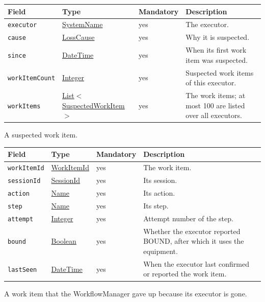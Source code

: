 \documentclass[a4paper]{arrowhead}
\newcommand{\mref}[1]{{\textcolor{ArrowheadPurple}{\hyperref[sec:model:#1]{#1}}}}
\newcommand{\pref}[1]{{\textcolor{ArrowheadGrey}{\hyperref[sec:model:primitives:#1]{#1}}}}
\begin{document}
{\small
\begin{longtable}{|p{3.7cm}|p{4.2cm}|p{1.6cm}|p{6.3cm}|}

\hline
\rowcolor{gray!33} Field & Type & Mandatory & Description \\ \hline
\endhead
\texttt{executor} & \pref{SystemName} & yes & The executor. \\ \hline
\texttt{cause} & \mref{LossCause} & yes & Why it is suspected. \\ \hline
\texttt{since} & \pref{DateTime} & yes & When its first work item was suspected. \\ \hline
\texttt{workItemCount} & \pref{Integer} & yes & Suspected work items of this executor. \\ \hline
\texttt{workItems} & \pref{List}$<$\mref{SuspectedWorkItem}$>$ & yes & The work items; at most 100 are listed over all executors. \\ \hline
\end{longtable}
}

A suspected work item.

{\small
\begin{longtable}{|p{3.7cm}|p{4.2cm}|p{1.6cm}|p{6.3cm}|}

\hline
\rowcolor{gray!33} Field & Type & Mandatory & Description \\ \hline
\endhead
\texttt{workItemId} & \pref{WorkItemId} & yes & The work item. \\ \hline
\texttt{sessionId} & \pref{SessionId} & yes & Its session. \\ \hline
\texttt{action} & \pref{Name} & yes & Its action. \\ \hline
\texttt{step} & \pref{Name} & yes & Its step. \\ \hline
\texttt{attempt} & \pref{Integer} & yes & Attempt number of the step. \\ \hline
\texttt{bound} & \pref{Boolean} & yes & Whether the executor reported BOUND, after which it uses the equipment. \\ \hline
\texttt{lastSeen} & \pref{DateTime} & yes & When the executor last confirmed or reported the work item. \\ \hline
\end{longtable}
}

A work item that the WorkflowManager gave up because its executor is gone.
\end{document}
